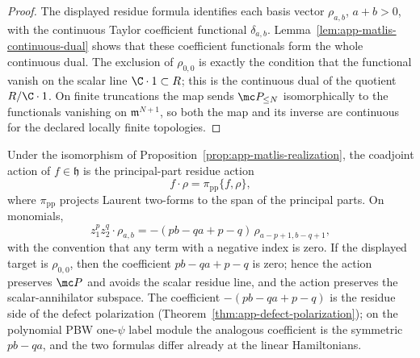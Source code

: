 \begin{proof}
  The displayed residue formula identifies each basis vector
  \(\rho_{a,b}\), \(a+b>0\), with the continuous Taylor coefficient
  functional \(\delta_{a,b}\).  Lemma~\ref{lem:app-matlis-continuous-dual}
  shows that these coefficient functionals form the whole continuous
  dual.  The exclusion of \(\rho_{0,0}\) is exactly the condition that
  the functional vanish on the scalar line \(\C\cdot1\subset R\); this is
  the continuous dual of the quotient \(R/\C\cdot1\).  On finite truncations
  the map sends \(\mc P_{\leq N}\) isomorphically to the functionals
  vanishing on \(\mathfrak m^{N+1}\), so both the map and its inverse are
  continuous for the declared locally finite topologies.
\end{proof}

\begin{prop}
\label{prop:app-matlis-coadjoint-action}
  Under the isomorphism of
  Proposition~\ref{prop:app-matlis-realization}, the coadjoint action
  of \(f\in\mathfrak h\) is the principal-part residue action
  \[
    f\cdot\rho=\pi_{\mathrm{pp}}\{f,\rho\},
  \]
  where \(\pi_{\mathrm{pp}}\) projects Laurent two-forms to the span
  of the principal parts.  On monomials,
  \begin{equation}
  \label{eq:app-matlis-coadjoint-monomial}
    z_1^p z_2^q\cdot\rho_{a,b}
      =-(pb-qa+p-q)\,\rho_{a-p+1,b-q+1},
  \end{equation}
  with the convention that any term with a negative index is zero.  If the
  displayed target is \(\rho_{0,0}\), then the coefficient \(pb-qa+p-q\)
  is zero; hence the action preserves \(\mc P\) and avoids the scalar
  residue line,
  and the action preserves the scalar-annihilator subspace.  The
  coefficient \(-(pb-qa+p-q)\) is the residue side of the defect
  polarization (Theorem~\ref{thm:app-defect-polarization}); on the
  polynomial PBW one-\(\psi\) label module the analogous coefficient is the
  symmetric \(pb-qa\), and the two formulas differ already at the linear
  Hamiltonians.
\end{prop}

